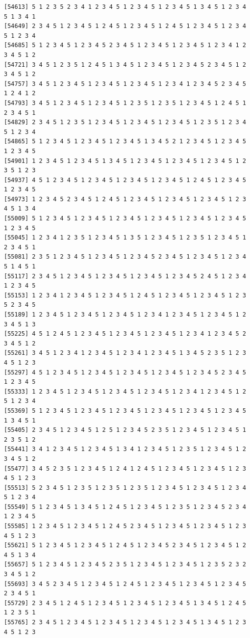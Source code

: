 \documentclass[
  english,
]{book}
\begin{document}
\begin{verbatim}
[54613] 5 1 2 3 5 2 3 4 1 2 3 4 5 1 2 3 4 5 1 2 3 4 5 1 3 4 5 1 2 3 4 5 1 3 4 1
[54649] 2 3 4 5 1 2 3 4 5 1 2 4 5 1 2 3 4 5 1 2 4 5 1 2 3 4 5 1 2 3 4 5 1 2 3 4
[54685] 5 1 2 3 4 5 1 2 3 4 5 2 3 4 5 1 2 3 4 5 1 2 3 4 5 1 2 3 4 1 2 3 4 5 1 2
[54721] 3 4 5 1 2 3 5 1 2 4 5 1 3 4 5 1 2 3 4 5 1 2 3 4 5 2 3 4 5 1 2 3 4 5 1 2
[54757] 3 4 5 1 2 3 4 5 1 2 3 4 5 1 2 3 4 5 1 2 3 4 1 2 3 4 5 2 3 4 5 1 2 4 1 2
[54793] 3 4 5 1 2 3 4 5 1 2 3 4 5 1 2 3 5 1 2 3 5 1 2 3 4 5 1 2 4 5 1 2 3 4 5 1
[54829] 2 3 4 5 1 2 3 5 1 2 3 4 5 1 2 3 4 5 1 2 3 4 5 1 2 3 5 1 2 3 4 5 1 2 3 4
[54865] 5 1 2 3 4 5 1 2 3 4 5 1 2 3 4 5 1 3 4 5 2 1 2 3 4 5 1 2 3 4 5 1 2 3 4 5
[54901] 1 2 3 4 5 1 2 3 4 5 1 3 4 5 1 2 3 4 5 1 2 3 4 5 1 2 3 4 5 1 2 3 5 1 2 3
[54937] 4 5 1 2 3 4 5 1 2 3 4 5 1 2 3 4 5 1 2 3 4 5 1 2 4 5 1 2 3 4 5 1 2 3 4 5
[54973] 1 2 3 4 5 2 3 4 5 1 2 4 5 1 2 3 4 5 1 2 3 4 5 1 2 3 4 5 1 2 3 4 5 1 3 4
[55009] 5 1 2 3 4 5 1 2 3 4 5 1 2 3 4 5 1 2 3 4 5 1 2 3 4 5 1 2 3 4 5 1 2 3 4 5
[55045] 1 2 3 4 1 2 3 5 1 2 3 4 5 1 3 5 1 2 3 4 5 1 2 3 5 1 2 3 4 5 1 2 3 4 5 1
[55081] 2 3 5 1 2 3 4 5 1 2 3 4 5 1 2 3 4 5 2 3 4 5 1 2 3 4 5 1 2 3 4 5 1 4 5 1
[55117] 2 3 4 5 1 2 3 4 5 1 2 3 4 5 1 2 3 4 5 1 2 3 4 5 2 4 5 1 2 3 4 1 2 3 4 5
[55153] 1 2 3 4 1 2 3 4 5 1 2 3 4 5 1 2 4 5 1 2 3 4 5 1 2 3 4 5 1 2 3 5 2 3 4 5
[55189] 1 2 3 4 5 1 2 3 4 5 1 2 3 4 5 1 2 3 4 1 2 3 4 5 1 2 3 4 5 1 2 3 4 5 1 3
[55225] 4 5 1 2 4 5 1 2 3 4 5 1 2 3 4 5 1 2 3 4 5 1 2 3 4 1 2 3 4 5 2 3 4 5 1 2
[55261] 3 4 5 1 2 3 4 1 2 3 4 5 1 2 3 4 1 2 3 4 5 1 3 4 5 2 3 5 1 2 3 4 5 1 2 3
[55297] 4 5 1 2 3 4 5 1 2 3 4 5 1 2 3 4 5 1 2 3 4 5 1 2 3 4 5 2 3 4 5 1 2 3 4 5
[55333] 1 2 3 4 5 1 2 3 4 5 1 2 3 4 5 1 2 3 4 5 1 2 3 4 1 2 3 4 5 1 2 5 1 2 3 4
[55369] 5 1 2 3 4 5 1 2 3 4 5 1 2 3 4 5 1 2 3 4 5 1 2 3 4 5 1 2 3 4 5 1 3 4 5 1
[55405] 2 3 4 5 1 2 3 4 5 1 2 5 1 2 3 4 5 2 3 5 1 2 3 4 5 1 2 3 4 5 1 2 3 5 1 2
[55441] 3 4 1 2 3 4 5 1 2 3 4 5 1 3 4 1 2 3 4 5 1 2 3 5 1 2 3 4 5 1 2 3 4 5 1 2
[55477] 3 4 5 2 3 5 1 2 3 4 5 1 2 4 1 2 4 5 1 2 3 4 5 1 2 3 4 5 1 2 3 4 5 1 2 3
[55513] 5 2 3 4 5 1 2 3 5 1 2 3 5 1 2 3 5 1 2 3 4 5 1 2 3 4 5 1 2 3 4 5 1 2 3 4
[55549] 5 1 2 3 4 5 1 3 4 5 1 2 4 5 1 2 3 4 5 1 2 3 5 1 2 3 4 5 2 3 4 1 2 3 4 5
[55585] 1 2 3 4 5 1 2 3 4 5 1 2 4 5 2 3 4 5 1 2 3 4 5 1 2 3 4 5 1 2 3 4 5 1 2 3
[55621] 5 1 2 3 4 5 1 2 3 4 5 1 2 4 5 1 2 3 4 5 2 3 4 5 1 2 3 4 5 1 2 4 5 1 3 4
[55657] 5 1 2 3 4 5 1 2 3 4 5 2 3 5 1 2 3 4 5 1 2 3 4 5 1 2 3 5 2 3 2 3 4 5 1 2
[55693] 3 4 5 2 3 4 5 1 2 3 4 5 1 2 4 5 1 2 3 4 5 1 2 3 4 5 1 2 3 4 5 2 3 4 5 1
[55729] 2 3 4 5 1 2 4 5 1 2 3 4 5 1 2 3 4 5 1 2 3 4 5 1 3 4 5 1 2 4 5 1 2 3 5 1
[55765] 2 3 4 5 1 2 3 4 5 1 2 3 4 5 1 2 3 4 5 1 2 3 4 5 1 3 4 5 1 2 3 4 5 1 2 3

\end{verbatim}
\end{document}

